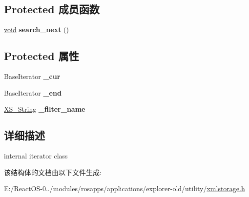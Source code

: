 \subsection*{Protected 成员函数}
\begin{DoxyCompactItemize}
\item 
\mbox{\label{struct_x_m_l_storage_1_1const___x_m_l_children_filter_1_1const__iterator_a2282ce9c118141fb80758dfba87ee50a}} 
\hyperlink{interfacevoid}{void} {\bfseries search\+\_\+next} ()
\end{DoxyCompactItemize}
\subsection*{Protected 属性}
\begin{DoxyCompactItemize}
\item 
\mbox{\label{struct_x_m_l_storage_1_1const___x_m_l_children_filter_1_1const__iterator_a27597a49dc967cbdee312e2f9f1d6adc}} 
Base\+Iterator {\bfseries \+\_\+cur}
\item 
\mbox{\label{struct_x_m_l_storage_1_1const___x_m_l_children_filter_1_1const__iterator_a88dfe5728be2be13dcdb8411c9fcf1b4}} 
Base\+Iterator {\bfseries \+\_\+end}
\item 
\mbox{\label{struct_x_m_l_storage_1_1const___x_m_l_children_filter_1_1const__iterator_a5214c9b36149b6c1f3de3c164fb8e836}} 
\hyperlink{struct_x_m_l_storage_1_1_x_s___string}{X\+S\+\_\+\+String} {\bfseries \+\_\+filter\+\_\+name}
\end{DoxyCompactItemize}


\subsection{详细描述}
internal iterator class 

该结构体的文档由以下文件生成\+:\begin{DoxyCompactItemize}
\item 
E\+:/\+React\+O\+S-\/0../modules/rosapps/applications/explorer-\/old/utility/\hyperlink{xmlstorage_8h}{xmlstorage.\+h}\end{DoxyCompactItemize}
